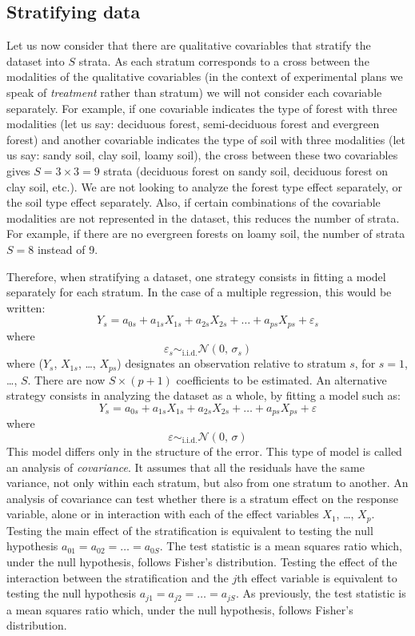 \subsection{Stratifying data\label{stdat}}

Let us now consider that there are qualitative covariables that stratify the dataset into $S$ strata. As each stratum corresponds to a cross between the modalities of the qualitative covariables (in the context of experimental plans we speak of \emph{treatment} rather than stratum) we will not consider each covariable separately. For example, if one covariable indicates the type of forest with three modalities (let us say: deciduous forest, semi-deciduous forest and evergreen forest) and another covariable indicates the type of soil with three modalities (let us say: sandy soil, clay soil, loamy soil), the cross between these two covariables gives $S=3\times 3=9$ strata (deciduous forest on sandy soil, deciduous forest on clay soil, etc.). We are not looking to analyze the forest type effect separately, or the soil type effect separately. Also, if certain combinations of the covariable modalities are not represented in the dataset, this reduces the number of strata. For example, if there are no evergreen forests on loamy soil, the number of strata $S=8$ instead of 9.

Therefore, when stratifying a dataset, one strategy consists in fitting a model separately for each stratum. In the case of a multiple regression, this would be written:
\[
Y_s=a_{0s}+a_{1s}X_{1s}+a_{2s}X_{2s}+\ldots+a_{ps}X_{ps}+\varepsilon_s
\]
where
\[
\varepsilon_s\mathop{\sim}_{\mathrm{i.i.d.}}\mathcal{N}(0,\,\sigma_s)
\]
where ($Y_s$, $X_{1s}$, \ldots, $X_{ps}$) designates an observation relative to stratum $s$, for $s=1$, \ldots, $S$. There are now $S\times(p+1)$ coefficients to be estimated. An alternative strategy consists in analyzing the dataset as a whole, by fitting a model such as:
\begin{equation}
Y_s=a_{0s}+a_{1s}X_{1s}+a_{2s}X_{2s}+\ldots+a_{ps}X_{ps}+\varepsilon
\label{ancov}
\end{equation}
where
\[
\varepsilon\mathop{\sim}_{\mathrm{i.i.d.}}\mathcal{N}(0,\,\sigma)
\]
This model differs only in the structure of the error. This type of model is called an analysis of \emph{covariance}. It assumes that all the residuals have the same variance, not only within each stratum, but also from one stratum to another. An analysis of covariance can test whether there is a stratum effect on the response variable, alone or in interaction with each of the effect variables $X_1$, \ldots, $X_p$. Testing the main effect of the stratification is equivalent to testing the null hypothesis $a_{01}=a_{02}=\ldots=a_{0S}$. The test statistic is a mean squares ratio which, under the null hypothesis, follows Fisher's distribution. Testing the effect of the interaction between the stratification and the $j$th effect variable is equivalent to testing the null hypothesis $a_{j1}=a_{j2}=\ldots=a_{jS}$. As previously, the test statistic is a mean squares ratio which, under the null hypothesis, follows Fisher's distribution.

